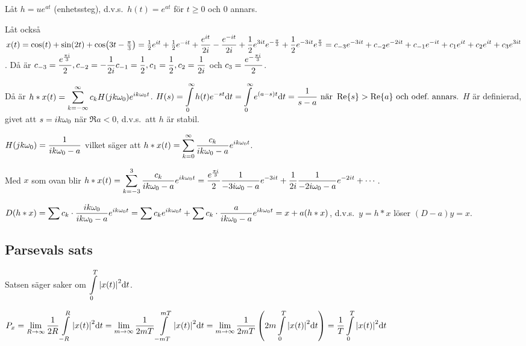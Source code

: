 \documentclass[a4paper]{article}
\begin{document}
\begin{ex}
    Låt \(
        h = ue^{at}
    \) (enhetssteg), d.v.s.\ \(
        h(t) = e^{at} 
    \) för \(
        t \geq 0
    \) och \(
        0
    \) annars.

    Låt också \(
        x(t) = \cos(t) + \sin(2t) + \cos(3t - \frac{\pi}{3})
        = \frac{1}{2} e^{it} + \frac{1}{2} e^{-it} + \displaystyle\frac{e^{it}}{2i} - \displaystyle\frac{e^{-it}}{2i}
        + \frac{1}{2} e^{3it} e^{-\frac{\pi}{3}} + \frac{1}{2} e^{-3it} e^{\frac{\pi}{3}}
        = c_{-3} e^{-3it} + c_{-2} e^{-2it} + c_{-1} e^{-it} + c_1 e^{it} + c_2 e^{it} + c_3 e^{3it}
    \). Då är \(
        c_{-3} = \displaystyle\frac{e^\frac{\pi i}{3} }{2}, 
        c_{-2} = -\displaystyle\frac{1}{2i}
        c_{-1} = \frac{1}{2} , 
        c_1 = \frac{1}{2},
        c_2 = \displaystyle\frac{1}{2i}
    \) och \(
        c_3 = \displaystyle\frac{e^{-\frac{\pi i}{3}} }{2}
    \).

    Då är \(
        h * x(t) =  \displaystyle\sum_{k=-\infty}^\infty c_k H(jk\omega_0) e^{ik\omega_0 t}
    \). \(
        H(s) = \bi_0^\infty h(t) e^{-st} \dd t
        = \bi_0^\infty e^{(a-s)t} \dd t
        = \inv{s-a} \text{ när } \Re{s} > \Re{a} \text{ och odef.\ annars.}
    \) \(
        H 
    \) är definierad, givet att \(
        s = ik\omega_0
    \) när \(
        \Re{a} < 0
    \), d.v.s.\ att \(
        h
    \) är stabil.

    \(
        H(jk\omega_0) = \displaystyle\frac{1}{ik\omega_0 -a} 
    \) vilket säger att \(
        h * x(t) = \displaystyle\sum_{k=0}^\infty \displaystyle\frac{c_k}{ik\omega_0 - a} e^{ik\omega_0 t}
    \). 

    Med \(
        x
    \) som ovan blir \(
        h*x(t) = \displaystyle\sum_{k=-3}^3 \displaystyle\frac{c_k}{ik\omega_0 -a} e^{ik\omega_0 t} 
        = \displaystyle\frac{e^{\frac{\pi i}{3}}}{2} \frac{1}{-3i\omega_0-a}e^{-3it} 
        + \displaystyle\frac{1}{2i} \frac{1}{-2i\omega_0-a}e^{-2it} + \cdots
    \).

    \(
        D(h*x) = \displaystyle\sum c_k \cdot \displaystyle\frac{ik\omega_0 }{ik\omega_0 - a} e^{ik\omega_0 t}
        = \displaystyle\sum c_k e^{ik\omega_0 t} + \displaystyle\sum c_k \cdot \displaystyle\frac{a}{ik\omega_0 - a} e^{ik\omega_0 t} 
        = x + a (h * x)
    \), d.v.s.\ \(
        y=h*x 
    \) löser \(
        (D-a)y = x
    \).
\end{ex}


\subsection{Parsevals sats}
Satsen säger saker om \(
    \displaystyle\int\limits_0^T \abs{x(t)}^2 \dd t
\). 

\begin{påm}
    \(
        P_x = \displaystyle\lim_{R \to \infty} \frac{1}{2R} \displaystyle\int\limits_{-R}^R \abs{x(t)}^2 \dd t
        = \displaystyle\lim_{m \to \infty} \frac{1}{2mT} \displaystyle\int\limits_{-mT}^{mT} \abs{x(t)}^2 \dd t
        = \displaystyle\lim_{m \to \infty} \frac{1}{2mT} \left( 2m \displaystyle\int\limits_{0}^{T} \abs{x(t)}^2 \dd t \right)
        = \displaystyle\frac{1}{T} \displaystyle\int\limits_0^T \abs{x(t)}^2 \dd t
    \)
\end{påm}
\end{document}

